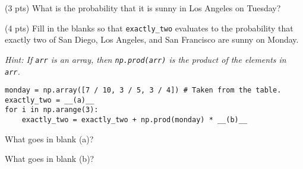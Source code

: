 \begin{prob}[(12 pts)]
\begin{subprobset}
\begin{subprob}
\end{subprob}

\begin{subprob}(3 pts) What is the probability that it is sunny in Los Angeles on Tuesday?


\end{subprob}





\newpage

\begin{subprob}(4 pts) Fill in the blanks so that \texttt{exactly\_two} evaluates to the probability that exactly two of San Diego, Los Angeles, and San Francisco are sunny on Monday.

\textit{Hint: If \texttt{arr} is an array, then \texttt{np.prod(arr)} is the product of the elements in \texttt{arr}.}

\begin{verbatim}
monday = np.array([7 / 10, 3 / 5, 3 / 4]) # Taken from the table.
exactly_two = __(a)__
for i in np.arange(3):
    exactly_two = exactly_two + np.prod(monday) * __(b)__
\end{verbatim}

What goes in blank (a)?

\begin{responsebox}{0.5in}
    
\end{responsebox}

What goes in blank (b)?






    
\end{subprob}

\end{subprobset}

\end{prob}

